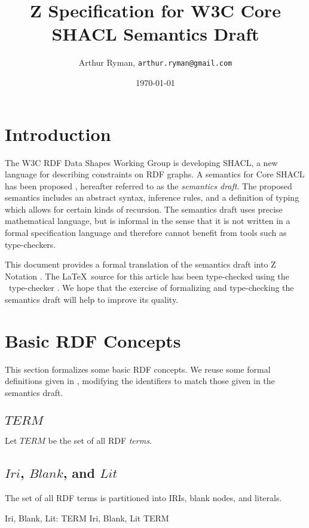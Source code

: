 \documentclass{article}
\title{Z Specification for W3C Core SHACL Semantics Draft}
\author{Arthur Ryman, {\tt arthur.ryman@gmail.com}}
\date{\today}
\begin{document}


\maketitle


\section{Introduction}
\label{sec-introduction}
The W3C RDF Data Shapes Working Group \cite{w3c:shapeswg} is developing SHACL, a new language for describing constraints on RDF graphs.
A semantics for Core SHACL has been proposed \cite{iovka:core-shacl}, hereafter referred to as the {\em semantics draft}.
The proposed semantics includes an abstract syntax, inference rules, and a definition of typing which allows for certain kinds of recursion.
The semantics draft uses precise mathematical language, but is informal in the sense that it is not written in a formal specification language
and therefore cannot benefit from tools such as type-checkers.

This document provides a formal translation of the semantics draft into Z Notation  \cite{spivey:zrm}.
The \LaTeX\ source for this article has been type-checked using the \fuzz\ type-checker \cite{spivey:fuzz}.
We hope that the exercise of formalizing and type-checking the semantics draft will help to improve its quality. 

\section{Basic RDF Concepts}
\label{sec-basic-rdf-concepts}
This section formalizes some basic RDF concepts.
We reuse some formal definitions given in \cite{arthur:recursion}, modifying the identifiers to match those given in the semantics draft.

\subsection{$TERM$}
Let $TERM$ be the set of all RDF {\em terms}.
\begin{zed}
	[TERM]
\end{zed}

\subsection{$Iri$, $Blank$, and $Lit$}
The set of all RDF terms is partitioned into IRIs, blank nodes, and literals.
\begin{axdef}
	Iri, Blank, Lit: \power TERM
\where
	\langle Iri, Blank, Lit \rangle \partition TERM
\end{axdef}
\end{document}
